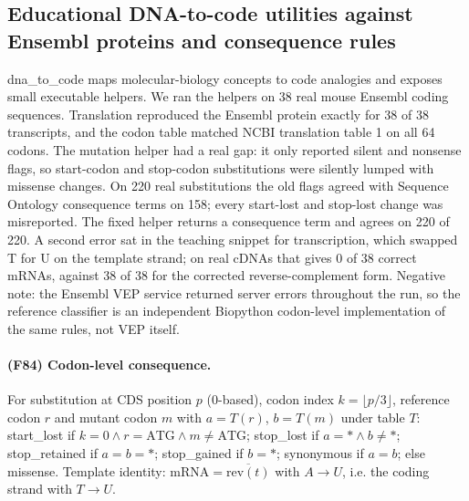\subsection{Educational DNA-to-code utilities against Ensembl proteins and consequence rules}
dna\_to\_code maps molecular-biology concepts to code analogies and exposes small executable helpers. We ran the helpers on 38 real mouse Ensembl coding sequences. Translation reproduced the Ensembl protein exactly for 38 of 38 transcripts, and the codon table matched NCBI translation table 1 on all 64 codons. The mutation helper had a real gap: it only reported silent and nonsense flags, so start-codon and stop-codon substitutions were silently lumped with missense changes. On 220 real substitutions the old flags agreed with Sequence Ontology consequence terms on 158; every start-lost and stop-lost change was misreported. The fixed helper returns a consequence term and agrees on 220 of 220. A second error sat in the teaching snippet for transcription, which swapped T for U on the template strand; on real cDNAs that gives 0 of 38 correct mRNAs, against 38 of 38 for the corrected reverse-complement form. Negative note: the Ensembl VEP service returned server errors throughout the run, so the reference classifier is an independent Biopython codon-level implementation of the same rules, not VEP itself.
\paragraph{(F84) Codon-level consequence.} For substitution at CDS position $p$ (0-based), codon index $k=\lfloor p/3\rfloor$, reference codon $r$ and mutant codon $m$ with $a=T(r)$, $b=T(m)$ under table $T$: start\_lost if $k=0\wedge r=\mathrm{ATG}\wedge m\neq\mathrm{ATG}$; stop\_lost if $a={*}\wedge b\neq{*}$; stop\_retained if $a=b={*}$; stop\_gained if $b={*}$; synonymous if $a=b$; else missense. Template identity: $\mathrm{mRNA}=\overline{\mathrm{rev}(t)}$ with $A\to U$, i.e. the coding strand with $T\to U$.

